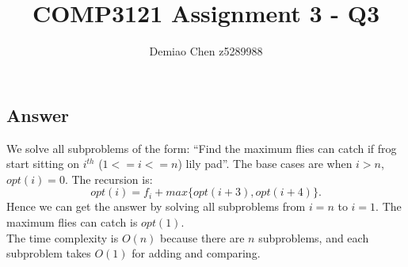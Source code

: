 \documentclass[12pt]{article}
\title{COMP3121 Assignment 3 - Q3}
\author{Demiao Chen z5289988}
\begin{document}
\maketitle
{}


\subsection*{Answer}
We solve all subproblems of the form: ``Find the maximum flies can catch if frog start
sitting on 
$i^{th}$ ($1 <= i <= n$) lily pad''.
The base cases are when $i > n$, $opt(i) = 0$.
The recursion is: $$
opt(i) = f_i + max\{opt(i+3), opt(i+4)\}.
$$
Hence we can get the answer by solving all subproblems from $i = n$ to $i = 1$. The
maximum flies can catch is $opt(1)$. \\
The time complexity is $O(n)$ because there are $n$ subproblems, 
and each subproblem takes $O(1)$ for adding and comparing.
\end{document}
